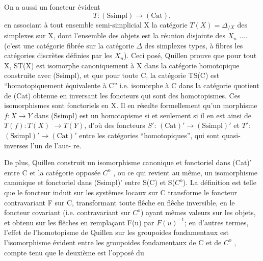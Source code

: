 On a aussi un foncteur évident
\[ T: (\mathrm{Ssimpl}) \longrightarrow (\mathrm{Cat}) , \]
en associant à tout ensemble semi-simplicial X la catégorie $T(X) = \Delta_{/X}$
des simplexes sur X, dont l'ensemble des objets est la réunion disjointe
des $X_n$ .... (c'est une catégorie fibrée sur la catégorie $\Delta$ des simplexes
types, à fibres les catégories discrètes définies par les $X_n$). Ceci posé,
Quillen prouve que pour tout X, ST(X) est isomorphe canoniquement à X dans
la catégorie homotopique construite avec (Ssimpl), et que pour toute C,
la catégorie TS(C) est  ``homotopiquement équivalente à C''  i.e.
 isomorphe à C dans la catégorie quotient de (Cat) obtenue en inversant les
foncteurs qui sont des homotopismes.  Ces isomorphismes sont
fonctoriels en X. Il en résulte formellement qu'un morphisme $f:X\to Y$ dans
(Ssimpl) est un homotopisme si et seulement si il en est ainsi de $T(f):T(X)$
$\to T(Y)$, d'où des foncteurs $S'$: $(\mathrm{Cat})' \longrightarrow (\mathrm{Ssimpl})'$ et $T'$:$(\mathrm{Ssimpl})'\longrightarrow(\mathrm{Cat})'$
entre les catégories ``homotopiques'',  \hand{/} qui sont quasi-inverses l'un de l'aut-%
re.

De plus, Quillen construit un isomorphisme canonique et fonctoriel
dans (Cat)' entre C et la catégorie opposée $C^{\mathrm{o}}$ , ou ce qui revient au
même, un isomorphisme canonique et fonctoriel dans (Ssimpl)' entre S(C) et
S($C^{\mathrm{o}}$).  La définition est telle que le
foncteur induit sur les systêmes locaux sur C transforme le foncteur
contravariant F sur C, transformant toute flêche en flêche inversible, en
le foncteur covariant (i.e. contravariant sur $C^{\mathrm{o}}$) ayant mêmes valeurs sur
les objets, et obtenu sur les flêches en remplaçant F(u) par $F(u)^{-1}$; en
d'autres termes, l'effet de l'homotopisme de Quillen sur les groupoides
fondamentaux est l'isomorphisme évident entre les groupoides fondamentaux
de C et de $C^{\mathrm{o}}$ , compte tenu que le deuxième est l'opposé du


